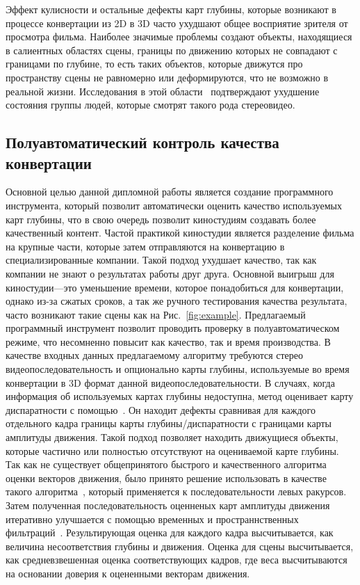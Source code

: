 \documentclass[14pt, a4paper]{extarticle}
\begin{document}
Эффект кулисности и остальные дефекты карт глубины, которые возникают в процессе 
конвертации из 2D в 3D часто ухудшают общее восприятие зрителя от просмотра фильма. 
Наиболее значимые проблемы создают объекты, находящиеся в салиентных областях 
сцены, границы по движению которых не совпадают с границами по глубине, то есть 
таких объектов, которые движутся про пространству сцены не равномерно или деформируются, 
что не возможно в реальной жизни. Исследования в этой области~\cite{jung2012visual,li2014visual} подтверждают ухудшение состояния группы людей, которые смотрят такого рода стереовидео.

\subsection{Полуавтоматический контроль качества конвертации}



Основной целью данной дипломной работы является создание программного инструмента, 
который позволит автоматически оценить качество используемых карт глубины,
что в свою очередь позволит киностудиям создавать более качественный контент. 
Частой практикой киностудии является разделение фильма на крупные части, которые 
затем отправляются на конвертацию в специализированные компании. Такой подход 
ухудшает качество, так как компании не знают о результатах работы друг друга. 
Основной выигрыш для киностудии---это уменьшение времени, которое понадобиться 
для конвертации, однако из-за сжатых сроков, а так же ручного тестирования 
качества результата, часто возникают такие сцены как на Рис.~\ref{fig:example}. 
Предлагаемый программный инструмент позволит проводить проверку в полуавтоматическом 
режиме, что несомненно повысит как качество, так и время производства.
В качестве входных данных предлагаемому алгоритму требуются стерео видеопоследовательность 
и опционально карты глубины, используемые во время конвертации в 3D формат данной видеопоследовательности. В случаях, когда информация об используемых картах 
глубины недоступна, метод оценивает карту диспаратности с помощью~\cite{simonyan2008fast,zhang2014100+}. Он находит дефекты сравнивая 
для каждого отдельного кадра границы карты глубины/диспаратности с границами карты 
амплитуды движения. Такой подход позволяет находить движущиеся объекты, которые 
частично или полностью отсутствуют на оцениваемой карте глубины. Так как не существует 
общепринятого быстрого и качественного алгоритма оценки векторов движения, было принято 
решение использовать в качестве такого алгоритма~\cite{simonyan2008fast}, который 
применяется к последовательности левых ракурсов. Затем полученная последовательность 
оценненых карт амплитуды движения итеративно улучшается с помощью временных и 
пространнственных фильтраций~\cite{fecker2007time,matyunin2011temporal,he2013guided}. 
Результирующая оценка для каждого кадра высчитывается, как величина несоответствия 
глубины и движения. Оценка для сцены высчитывается, как средневзвешенная оценка 
соответствующих кадров, где веса высчитываются на основании доверия 
к оцененными векторам движения.
\end{document}
